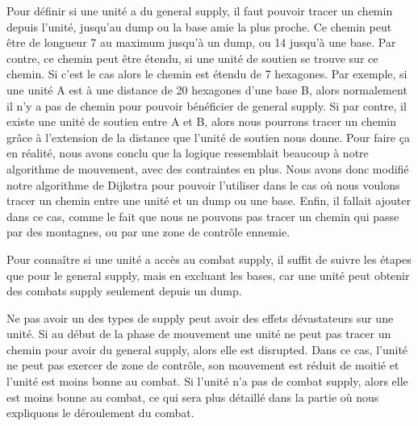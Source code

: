 Pour définir si une unité a du general supply, il faut pouvoir tracer un chemin depuis l'unité, jusqu'au dump ou la
base amie la plus proche. Ce chemin peut être de longueur 7 au maximum jusqu'à un dump, ou 14 jusqu'à une base. Par
contre, ce chemin peut être étendu, si une unité de soutien se trouve sur ce chemin. Si c'est le cas alors le chemin est
étendu de 7 hexagones. Par exemple, si une unité A est à une distance de 20 hexagones d'une base B, alors normalement
il n'y a pas de chemin pour pouvoir bénéficier de general supply. Si par contre, il existe une unité de soutien entre
A et B, alors nous pourrons tracer un chemin grâce à l'extension de la distance que l'unité de soutien nous donne.
Pour faire ça en réalité, nous avons conclu que la logique ressemblait beaucoup à notre algorithme de mouvement,
avec des contraintes en plus. Nous avons donc modifié notre algorithme de Dijkstra pour pouvoir l'utiliser dans
le cas où nous voulons tracer un chemin entre une unité et un dump ou une base. Enfin, il fallait ajouter dans ce cas, comme le fait que nous ne pouvons pas tracer un chemin qui passe par des montagnes,
ou par une zone de contrôle ennemie.

Pour connaître si une unité a accès au combat supply, il suffit de suivre les étapes que pour le general supply,
mais en excluant les bases, car une unité peut obtenir des combats supply seulement depuis un dump.

Ne pas avoir un des types de supply peut avoir des effets dévastateurs sur une unité. Si au début de la phase de
mouvement une unité ne peut pas tracer un chemin pour avoir du general supply, alors elle est disrupted.
Dans ce cas, l'unité ne peut pas exercer de zone de contrôle, son mouvement est réduit de moitié et l'unité est
moins bonne au combat. Si l'unité n'a pas de combat supply, alors elle est moins bonne au combat, ce qui sera plus
détaillé dans la partie où nous expliquons le déroulement du combat.
